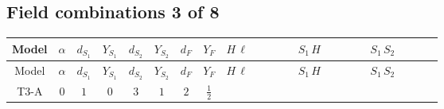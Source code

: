 \documentclass[8pt]{article}
\begin{document}
\begin{landscape}
\subsection*{Field combinations 3 of 8}
\begin{longtable}{@{}cccccccc >{\raggedright\arraybackslash}p{0.21\linewidth} >{\raggedright\arraybackslash}p{0.21\linewidth} >{\raggedright\arraybackslash}p{0.21\linewidth}@{}}
\toprule
Model & $\alpha$ & $d_{S_1}$ & $Y_{S_1}$ & $d_{S_2}$ & $Y_{S_2}$ & $d_F$ & $Y_F$ & $H\,\ell$ & $S_1\,H$ & $S_1\,S_2$ \\
\midrule
\endfirsthead
\toprule
Model & $\alpha$ & $d_{S_1}$ & $Y_{S_1}$ & $d_{S_2}$ & $Y_{S_2}$ & $d_F$ & $Y_F$ & $H\,\ell$ & $S_1\,H$ & $S_1\,S_2$ \\
\midrule
\endhead
T3-A & $0$ & $1$ & $0$ & $3$ & $1$ & $2$ & $\frac{1}{2}$ & \scriptsize\adjustbox{max width=\linewidth}{$\begin{gathered} +\frac{2 \hbar  \overline{y_{1,i_1,r_1}} \overline{y_{2,i_2,r_1}} L_{a_4,i_2}{}^T\, C\, P_L\, L_{a_2,i_1} H_{a_1} H_{a_3} \lambda_5 \epsilon_{a_1,a_2} \epsilon_{a_3,a_4}}{\sqrt{3} \epsilon  M_F} \\ +\frac{2 \hbar  \overline{y_{1,i_1,r_1}} \overline{y_{2,i_2,r_1}} L_{a_4,i_2}{}^T\, C\, P_L\, L_{a_2,i_1} H_{a_1} H_{a_3} \lambda_5 \epsilon_{a_1,a_2} \epsilon_{a_3,a_4}}{\sqrt{3} M_F} \\ +\frac{2 \hbar  \overline{\lambda_5} \overline{L_{a_3,i_1}}\, C\, P_R\, \overline{L_{a_4,i_2}}{}^T y_{1,i_1,r_1} y_{2,i_2,r_1} \epsilon_{a_1,a_3} \epsilon_{a_2,a_4} H_{a_1}{}^{\dagger } H_{a_2}{}^{\dagger }}{\sqrt{3} \epsilon  M_F}\end{gathered}$} & \scriptsize\adjustbox{max width=\linewidth}{$\begin{gathered} -\frac{2 \hbar  \overline{y_{1,i_1,r_1}} \overline{Y_{e,i_2,i_3}} H_{a_1} S_1 y_{1,i_2,r_1} Y_{e,i_1,i_3} H_{a_1}{}^{\dagger } S_1{}^{\dagger }}{\epsilon } \\ -2 \hbar  \overline{y_{1,i_1,r_1}} \overline{Y_{e,i_2,i_3}} H_{a_1} S_1 y_{1,i_2,r_1} Y_{e,i_1,i_3} H_{a_1}{}^{\dagger } S_1{}^{\dagger } \\ +H_{a_2} S_1 H_{a_1}{}^{\dagger } S_1{}^{\dagger } \mathcal{I}_{H1,a_1,a_2}{}^1 \lambda_{HS_1}^{(1)}^{(1)}\end{gathered}$} & \scriptsize\adjustbox{max width=\linewidth}{$\begin{gathered} -\frac{4 \hbar  \overline{y_{1,i_1,r_1}} \overline{y_{2,i_2,r_2}} S_1 S_{2,j_1} y_{1,i_2,r_1} y_{2,i_1,r_2} S_1{}^{\dagger } S_{2,j_1}{}^{\dagger }}{\sqrt{3} \epsilon } \\ +\frac{4 \hbar  \overline{y_{1,i_1,r_1}} \overline{y_{2,i_2,r_1}} S_1 S_{2,j_1} y_{1,i_2,r_2} y_{2,i_1,r_2} S_1{}^{\dagger } S_{2,j_1}{}^{\dagger }}{\sqrt{3}} \\ +\frac{4 \hbar  \overline{y_{1,i_1,r_1}} \overline{y_{2,i_2,r_1}} S_1 S_{2,j_1} y_{1,i_1,r_2} y_{2,i_2,r_2} S_1{}^{\dagger } S_{2,j_1}{}^{\dagger }}{\sqrt{3}}\end{gathered}$} \\

\end{longtable}
\end{landscape}
\end{document}
